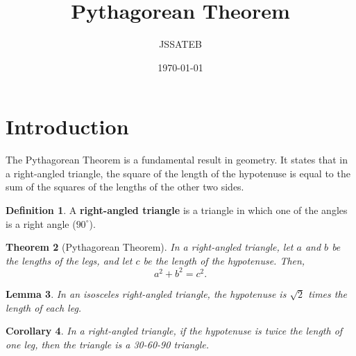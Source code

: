 \documentclass{article}
\title{Pythagorean Theorem}
\author{JSSATEB}
\date{\today}
\theoremstyle{plain}
\newtheorem{theorem}{Theorem}[section]
\newtheorem{lemma}[theorem]{Lemma}
\newtheorem{corollary}[theorem]{Corollary}
\theoremstyle{definition}
\newtheorem{definition}[theorem]{Definition}
\begin{document}
	\maketitle
	
	\section{Introduction}
	The Pythagorean Theorem is a fundamental result in geometry. It states that in a right-angled triangle, the square of the length of the hypotenuse is equal to the sum of the squares of the lengths of the other two sides.
	
	\begin{definition}
		A \textbf{right-angled triangle} is a triangle in which one of the angles is a right angle (\(90^\circ\)).
	\end{definition}
	
	\begin{theorem}[Pythagorean Theorem] 
		In a right-angled triangle, let \( a \) and \( b \) be the lengths of the legs, and let \( c \) be the length of the hypotenuse. Then,
		\[
		a^2 + b^2 = c^2.
		\]
	\end{theorem}
	
	\begin{lemma}
		In an isosceles right-angled triangle, the hypotenuse is \( \sqrt{2} \) times the length of each leg.
	\end{lemma}
	
	\begin{corollary}
		In a right-angled triangle, if the hypotenuse is twice the length of one leg, then the triangle is a 30-60-90 triangle.
	\end{corollary}
	
\end{document}
